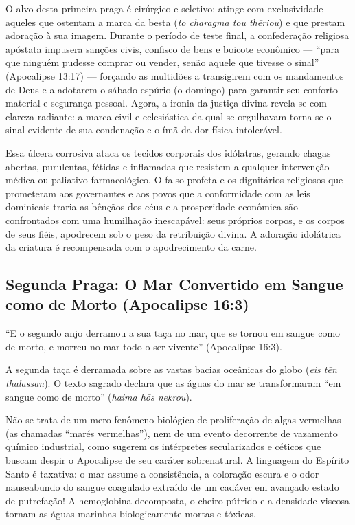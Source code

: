 \documentclass[11pt,a4paper,openany]{book}
\begin{document}
O alvo desta primeira praga é cirúrgico e seletivo: atinge com exclusividade aqueles que ostentam a marca da besta (\textit{to charagma tou thēriou}) e que prestam adoração à sua imagem. Durante o período de teste final, a confederação religiosa apóstata impusera sanções civis, confisco de bens e boicote econômico — ``para que ninguém pudesse comprar ou vender, senão aquele que tivesse o sinal'' (Apocalipse 13:17) — forçando as multidões a transigirem com os mandamentos de Deus e a adotarem o sábado espúrio (o domingo) para garantir seu conforto material e segurança pessoal. Agora, a ironia da justiça divina revela-se com clareza radiante: a marca civil e eclesiástica da qual se orgulhavam torna-se o sinal evidente de sua condenação e o ímã da dor física intolerável.

Essa úlcera corrosiva ataca os tecidos corporais dos idólatras, gerando chagas abertas, purulentas, fétidas e inflamadas que resistem a qualquer intervenção médica ou paliativo farmacológico. O falso profeta e os dignitários religiosos que prometeram aos governantes e aos povos que a conformidade com as leis dominicais traria as bênçãos dos céus e a prosperidade econômica são confrontados com uma humilhação inescapável: seus próprios corpos, e os corpos de seus fiéis, apodrecem sob o peso da retribuição divina. A adoração idolátrica da criatura é recompensada com o apodrecimento da carne.



\subsection{Segunda Praga: O Mar Convertido em Sangue como de Morto (Apocalipse 16:3)}


``E o segundo anjo derramou a sua taça no mar, que se tornou em sangue como de morto, e morreu no mar todo o ser vivente'' (Apocalipse 16:3).

A segunda taça é derramada sobre as vastas bacias oceânicas do globo (\textit{eis tēn thalassan}). O texto sagrado declara que as águas do mar se transformaram ``em sangue como de morto'' (\textit{haima hōs nekrou}).

Não se trata de um mero fenômeno biológico de proliferação de algas vermelhas (as chamadas ``marés vermelhas''), nem de um evento decorrente de vazamento químico industrial, como sugerem os intérpretes secularizados e céticos que buscam despir o Apocalipse de seu caráter sobrenatural. A linguagem do Espírito Santo é taxativa: o mar assume a consistência, a coloração escura e o odor nauseabundo do sangue coagulado extraído de um cadáver em avançado estado de putrefação! A hemoglobina decomposta, o cheiro pútrido e a densidade viscosa tornam as águas marinhas biologicamente mortas e tóxicas.
\end{document}
